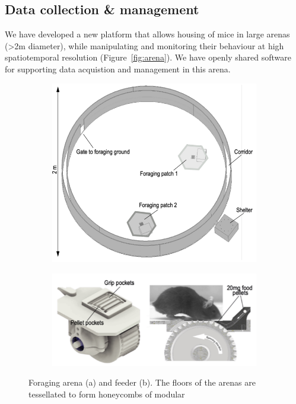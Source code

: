 \subsection{Data collection \& management}

We have developed a new platform that allows housing of mice in large arenas
(\textgreater 2m diameter), while manipulating and monitoring their behaviour
at high spatiotemporal resolution (Figure~\ref{fig:arena}).
%
We have openly shared software for supporting data acquistion
\citep{aeon_acquistion} and management \citep{aeon_mecha} in this arena.

\begin{figure}
    \begin{subfigure}{\textwidth}
        \centering
        \includegraphics[width=4in]{figures/arena.png}
        \caption{}
    \end{subfigure}
    \par\bigskip
    \begin{subfigure}{\textwidth}
        \centering
        \includegraphics[width=4in]{figures/patch.png}
        \caption{}
    \end{subfigure}
    \caption{Foraging arena (a) and feeder (b).
    The floors of the arenas are tessellated to form honeycombs of modular
}
\end{figure}

